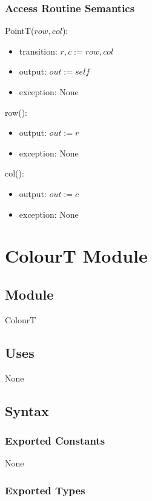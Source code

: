 \documentclass[12pt]{article}
\begin{document}
\subsubsection* {Access Routine Semantics}

PointT($row, col$):
\begin{itemize}
\item transition: $r, c := row, col$
\item output: $out := \mathit{self}$
\item exception: None
\end{itemize}

\noindent row():
\begin{itemize}
\item output: $out := r$
\item exception: None
\end{itemize}

\noindent col():
\begin{itemize}
\item output: $out := c$
\item exception: None
\end{itemize}

\newpage


\section* {ColourT Module}

\subsection*{Module}

ColourT

\subsection* {Uses}

None

\subsection* {Syntax}

\subsubsection* {Exported Constants}

None

\subsubsection* {Exported Types}
\end{document}
